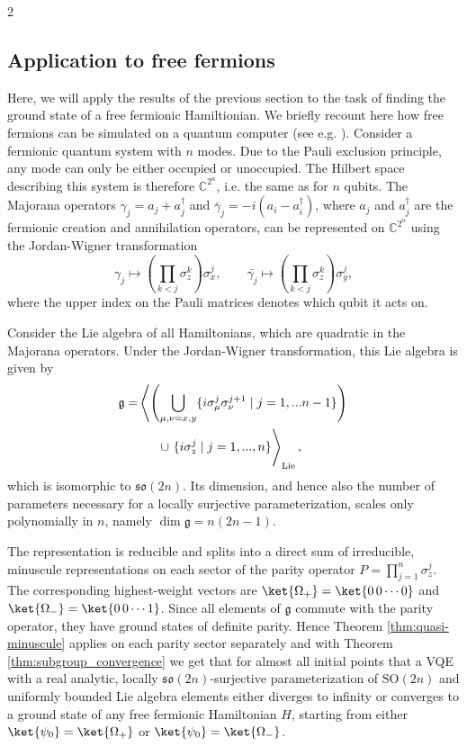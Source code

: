 \documentclass{article}
\begin{document}
\begin{multicols}{2}
\subsection{Application to free fermions}
\label{sec:free_fermions}
Here, we will apply the results of the previous section to the task of finding the ground state of a free fermionic Hamiltionian.
We briefly recount here how free fermions can be simulated on a quantum computer (see e.g. \cite{chien_simulating_2026}).
Consider a fermionic quantum system with \(n\) modes.
Due to the Pauli exclusion principle, any mode can only be either occupied or unoccupied.
The Hilbert space describing this system is therefore \(\mathds{C}^{2^n}\), i.e. the same as for \(n\) qubits.
The Majorana operators \(\gamma_j = a_j + a^\dagger_j\) and \(\bar{\gamma}_j = -i (a_i - a^\dagger_i)\), where \(a_j\) and \(a^\dagger_j\) are the fermionic creation and annihilation operators, can be represented on \(\mathds{C}^{2^n}\) using the Jordan-Wigner transformation
\begin{equation}
    \gamma_j \mapsto (\prod_{k<j} \sigma_z^k) \sigma_x^j, \qquad \bar{\gamma_j} \mapsto (\prod_{k<j} \sigma_z^k) \sigma_y^j,
\end{equation}
where the upper index on the Pauli matrices denotes which qubit it acts on.

Consider the Lie algebra of all Hamiltonians, which are quadratic in the Majorana operators.
Under the Jordan-Wigner transformation, this Lie algebra is given by \cite{goh_lie-algebraic_2025}
\begin{align}
    \mathfrak{g} = & \left\langle\left(\bigcup_{\mu, \nu = x, y} \{i\sigma_\mu^j \sigma_\nu^{j+1} \mid j = 1,...n-1\}\right) \right. \nonumber \\
     & \hphantom{\Bigg\langle\Bigg(} \cup \left. \{i \sigma_z^j \mid j=1,...,n\} \vphantom{\bigcup_{\mu, \nu = x, y}} \right\rangle_\text{Lie},
\end{align}
which is isomorphic to \(\mathfrak{so}(2n)\).
Its dimension, and hence also the number of parameters necessary for a locally surjective parameterization, scales only polynomially in \(n\), namely \(\operatorname{dim} \mathfrak{g} = n(2n-1)\).

The representation is reducible and splits into a direct sum of irreducible, minuscule representations on each sector of the parity operator \(P = \prod_{j=1}^n \sigma_z^j\).
The corresponding highest-weight vectors are $\ket{\Omega_+} = \ket{0\,0\cdots 0}$ and $\ket{\Omega_-} = \ket{0\,0\cdots 1}$.
Since all elements of \(\mathfrak{g}\) commute with the parity operator, they have ground states of definite parity.
Hence Theorem \ref{thm:quasi-minuscule} applies on each parity sector separately and with Theorem \ref{thm:subgroup_convergence} we get that for almost all initial points that a \gls{VQE} with a real analytic, locally \(\mathfrak{so}(2n)\)-surjective parameterization of \(\mathrm{SO}(2n)\) and uniformly bounded Lie algebra elements either diverges to infinity or converges to a ground state of any free fermionic Hamiltonian \(H\), starting from either \(\ket{\psi_0} = \ket{\Omega_+}\) or \(\ket{\psi_0} = \ket{\Omega_-}\).


\end{multicols}
\end{document}
